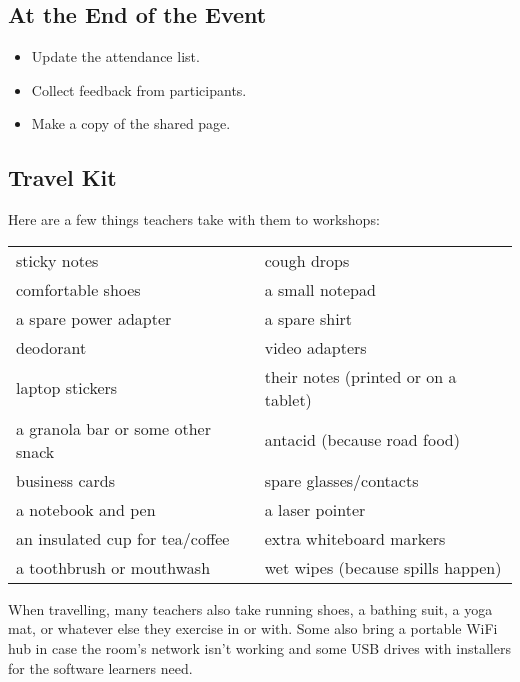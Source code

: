 \subsection*{At the End of the Event}

\begin{itemize}

\item
  Update the attendance list.

\item
  Collect feedback from participants.

\item
  Make a copy of the shared page.

\end{itemize}

\subsection*{Travel Kit}

Here are a few things teachers take with them to workshops:

\begin{longtable}{p{}p{}}

sticky notes & cough drops \\
comfortable shoes & a small notepad \\
a spare power adapter & a spare shirt \\
deodorant & video adapters \\
laptop stickers & their notes (printed or on a tablet) \\
a granola bar or some other snack & antacid (because road food) \\
business cards & spare glasses/contacts \\
a notebook and pen & a laser pointer \\
an insulated cup for tea/coffee & extra whiteboard markers \\
a toothbrush or mouthwash & wet wipes (because spills happen) \\

\end{longtable}

When travelling,
many teachers also take running shoes, a bathing suit, a yoga mat,
or whatever else they exercise in or with.
Some also bring a portable WiFi hub in case the room's network isn't working
and some USB drives with installers for the software learners need.


